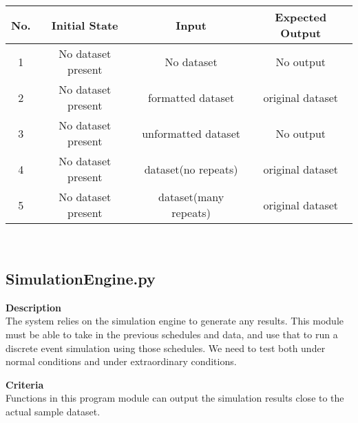 \documentclass[12pt]{article}
\begin{document}
\begin{tabular}{|c|c|c|c|}
\hline
\textbf{No.}  & \textbf{Initial State} & \textbf{Input} & \textbf{Expected Output} 
\\ \hline
1  & No dataset present & No dataset & No output 
\\ \hline
2  & No dataset present & formatted dataset & original dataset 
\\ \hline
3  & No dataset present & unformatted dataset & No output 
\\ \hline
4  & No dataset present & dataset(no repeats) & original dataset 
\\ \hline
5  & No dataset present & dataset(many repeats) & original dataset
\\ \hline
\end{tabular}\\

\quad

\quad



\subsection{SimulationEngine.py} 

\textbf{Description}\\

The system relies on the simulation engine to generate any results. This module must be able to take in the previous schedules and data, and use that to run a discrete event simulation using those schedules. We need to test both under normal conditions and under extraordinary conditions. 

\quad


\textbf{Criteria}\\

Functions in this program module can output the simulation results close to the actual 
sample dataset.\\

\quad
\end{document}
